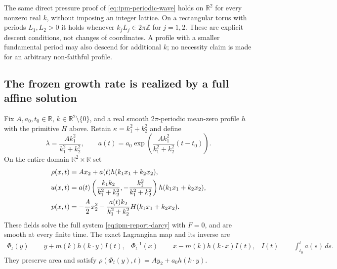 The same direct pressure proof of \eqref{eq:ipm-periodic-wave} holds on
$\mathbb R^2$ for every nonzero real $k$, without imposing an integer lattice.
On a rectangular torus with periods $L_1,L_2>0$ it holds whenever
$k_jL_j\in2\pi\mathbb Z$ for $j=1,2$. These are explicit descent conditions,
not changes of coordinates. A profile with a smaller fundamental period
may also descend for additional $k$; no necessity claim is made for an
arbitrary non-faithful profile.

\subsection{The frozen growth rate is realized by a full affine solution}

\begin{theorem}
\label{thm:ipm-affine-solution}
Fix $A,a_0,t_0\in\mathbb R$, $k\in\mathbb R^2\setminus\{0\}$, and a real
smooth $2\pi$-periodic mean-zero profile $h$ with the primitive $H$ above.
Retain $\kappa=k_1^2+k_2^2$ and define
\begin{equation}\label{eq:ipm-affine-amplitude}
 \lambda=\frac{A k_1^2}{k_1^2+k_2^2},\qquad
 a(t)=a_0\exp\left(\frac{A k_1^2}{k_1^2+k_2^2}(t-t_0)\right).
\end{equation}
On the entire domain $\mathbb R^2\times\mathbb R$ set
\begin{align}\label{eq:ipm-affine-fields}
 \rho(x,t)&=A x_2+a(t)h(k_1x_1+k_2x_2),\\
 u(x,t)&=a(t)\left(\frac{k_1k_2}{k_1^2+k_2^2},
                  -\frac{k_1^2}{k_1^2+k_2^2}\right)h(k_1x_1+k_2x_2),\notag\\
 p(x,t)&=-\frac A2 x_2^2
         -\frac{a(t)k_2}{k_1^2+k_2^2}H(k_1x_1+k_2x_2).
 \notag
\end{align}
These fields solve the full system \eqref{eq:ipm-report-darcy} with $F=0$,
and are smooth at every finite time. The exact Lagrangian map and its inverse
are
\begin{align}\label{eq:ipm-affine-flow}
 \Phi_t(y)&=y+m(k)h(k\cdot y)I(t),&
 \Phi_t^{-1}(x)&=x-m(k)h(k\cdot x)I(t),&
 I(t)&=\int_{t_0}^t a(s)\,ds.
\end{align}
They preserve area and satisfy
$\rho(\Phi_t(y),t)=A y_2+a_0h(k\cdot y)$.
\end{theorem}
